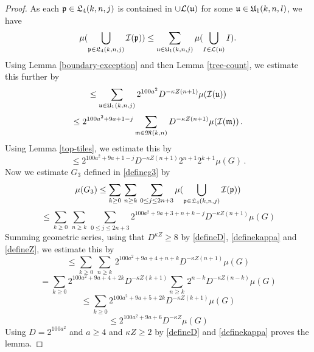 {    \begin{proof}
As each $\fp\in \fL_4(k,n,j)$
is contained in $\cup\mathcal{L}(\fu)$ for some
$\fu\in \fU_1(k,n,l)$, we have
\begin{equation}
\mu(\bigcup_{\fp \in \fL_4 (k,n,j)}\sc(\fp))
\le \sum_{\fu\in \fU_1(k,n,j)}
\mu(\bigcup_{I \in \mathcal{L} (\fu)}I).
\end{equation}
Using Lemma \ref{boundary-exception} and then Lemma \ref{tree-count}, we estimate this further
 by
\begin{equation}
    \le \sum_{\fu\in \fU_1(k,n,j)}
    2^{100a^2} D^{-\kappa Z(n+1)}
        \mu(\sc(\mathfrak{u}))
\end{equation}
\begin{equation}
    \le 2^{100a^2+9a+1-j} \sum_{\mathfrak{m}\in \mathfrak{M}(k,n)}
     D^{-\kappa Z(n+1)}
    \mu(\sc(\mathfrak{m}))\,.
\end{equation}
Using Lemma \ref{top-tiles}, we estimate this by
  \begin{equation}
     \le
2^{100a^2 + 9a + 1-j}  D^{-\kappa Z(n+1)}
     2^{n+1}2^{k+1}\mu(G)\, .
\end{equation}
Now we estimate $G_3$ defined in \eqref{defineg3} by
\begin{equation}
    \mu(G_3)\le \sum_{k\ge 0}\, \sum_{n \geq k}\,
    \sum_{0\le j\le 2n+3}
    \mu(\bigcup_{\fp \in \fL_4 (k,n,j)}
    \sc(\fp))
\end{equation}
\begin{equation}
    \le \sum_{k\ge 0}\, \sum_{n \geq k}\,
    \sum_{0\le j\le 2n+3}
    2^{100a^2 + 9a + 3 + n + k -j}  D^{-\kappa Z(n+1)}\mu(G)
\end{equation}
Summing geometric series, using that $D^{\kappa Z}\ge 8$ by \eqref{defineD}, \eqref{definekappa} and \eqref{defineZ}, we estimate this by
\begin{equation}
    \le \sum_{k\ge 0}\, \sum_{n \geq k}\,
    2^{100a^2 + 9a + 4 + n + k}  D^{-\kappa Z(n+1)}\mu(G)
\end{equation}
\begin{equation}
    = \sum_{k\ge 0} 2^{100a^2 + 9a + 4 + 2k} D^{-\kappa Z(k+1)} \sum_{n \geq k}\,
    2^{n - k}  D^{-\kappa Z(n-k)}\mu(G)
\end{equation}
\begin{equation}
    \le \sum_{k\ge 0} 2^{100a^2 + 9a + 5 + 2k}  D^{-\kappa Z(k+1)}\mu(G)
\end{equation}
\begin{equation}
   \le 2^{100a^2 + 9a + 6}  D^{-\kappa Z}\mu(G)
\end{equation}
Using $D = 2^{100a^2}$ and $a \ge 4$ and $\kappa Z \ge 2$ by \eqref{defineD} and \eqref{definekappa} proves the lemma.
\end{proof}

}

